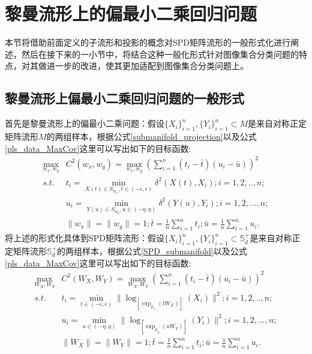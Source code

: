 \section{黎曼流形上的偏最小二乘回归问题}
\label{sec:RPLS}
本节将借助前面定义的子流形和投影的概念对SPD矩阵流形的一般形式化进行阐述，然后在接下来的一小节中，将结合这种一般化形式针对图像集合分类问题的特点，对其做进一步的改进，使其更加适配到图像集合分类问题上。
\subsection{黎曼流形上偏最小二乘回归问题的一般形式}
\label{sec:RPLS_common}
首先是黎曼流形上的偏最小二乘问题：假设$\{X_i\}_{i=1}^{n},\{Y_i\}_{i=1}^{n} \subset M$是来自对称正定矩阵流形$M$的两组样本，根据公式\ref{submanifold_projection}以及公式\ref{pls_data_MaxCov}这里可以写出如下的目标函数:
\begin{equation}
\label{Riemannian_PLS}
\begin{split}
\max_{w_x,w_y}& C^2(w_x,w_y)=\max_{w_x,w_y}{\left(\sum_{i=1}^{n}(t_i-\bar{t})(u_i-\bar{u})\right)^2}\\
s.t.~~&t_i=\min_{X(t) \in S_{w_x},t \in (-\epsilon,\epsilon)}\delta^{2}(X(t),X_i);i=1,2,..,n;\\
&u_i=\min_{Y(u) \in S_{w_y},u \in (-\eta,\eta)}\delta^{2}(Y(u),Y_i);i=1,2,...,n;\\
&\|w_x\|=\|w_y\|=1;\bar{t}=\frac{1}{n}\sum_{i=1}^{n}t_i;\bar{u}=\frac{1}{n}\sum_{i=1}^{n}u_i.
\end{split}
\end{equation}
将上述的形式化具体到SPD矩阵流形：假设$\{X_i\}_{i=1}^{n},\{Y_i\}_{i=1}^{n} \subset \mathbb{S}_{d}^{+}$是来自对称正定矩阵流形$\mathbb{S}_{d}^{+}$的两组样本，根据公式\ref{SPD_submanifold}以及公式\ref{pls_data_MaxCov}这里可以写出如下的目标函数:
\begin{equation}
\label{SPD_RPLS}
\begin{split}
\max_{W_X,W_Y}& C^2(W_X,W_Y)=\max_{W_X,W_Y}{\left(\sum_{i=1}^{n}(t_i-\bar{t})(u_i-\bar{u})\right)^2}\\
s.t.~~&t_i=\min_{t \in (-\epsilon,\epsilon)}\|\log_{[\exp_{\mu_x}(tW_X)]}(X_i)\|^2;i=1,2,..,n;\\
&u_i=\min_{u \in (-\eta,\eta)}\|\log_{[\exp_{\mu_y}(uW_Y)]}(Y_i)\|^2;i=1,2,...,n;\\
&\|W_X\|=\|W_Y\|=1;\bar{t}=\frac{1}{n}\sum_{i=1}^{n}t_i;\bar{u}=\frac{1}{n}\sum_{i=1}^{n}u_i.
\end{split}
\end{equation}

